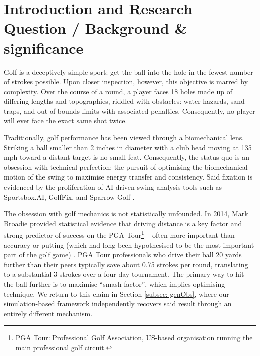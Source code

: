 \documentclass[11pt, letterpaper]{article}
\begin{document}
\newpage
\setcounter{page}{1} %

\section{Introduction and Research Question / Background \& significance}
\label{sec: Intro}

Golf is a deceptively simple sport: get the ball into the hole in the fewest number of strokes possible. Upon closer inspection, however, this objective is marred by complexity. Over the course of a round, a player faces 18 holes made up of differing lengths and topographies, riddled with obstacles: water hazards, sand traps, and out-of-bounds limits with associated penalties. Consequently, no player will ever face the exact same shot twice.

Traditionally, golf performance has been viewed through a biomechanical lens. Striking a ball smaller than 2 inches in diameter with a club head moving at 135 mph toward a distant target is no small feat. Consequently, the status quo is an obsession with technical perfection: the pursuit of optimising the biomechanical motion of the swing to maximise energy transfer and consistency. Said fixation is evidenced by the proliferation of AI-driven swing analysis tools such as Sportsbox.AI, GolfFix, and Sparrow Golf \parencite{sportsbox2026, golffix2026, sparrow2026}.

The obsession with golf mechanics is not statistically unfounded. In 2014, Mark Broadie provided statistical evidence that driving distance is a key factor and strong predictor of success on the PGA Tour\footnote{PGA Tour: Professional Golf Association, US-based organisation running the main professional golf circuit.} -- often more important than accuracy or putting (which had long been hypothesised to be the most important part of the golf game) \parencite{Broadie_2014a}. PGA Tour professionals who drive their ball 20 yards further than their peers typically save about 0.75 strokes per round, translating to a substantial 3 strokes over a four-day tournament. The primary way to hit the ball further is to maximise ``smash factor'', which implies optimising technique. We return to this claim in Section \ref{subsec: genObs}, where our simulation-based framework independently recovers said result through an entirely different mechanism. 
\end{document}
